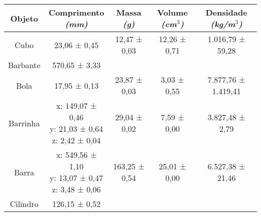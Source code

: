 \documentclass{article}
\begin{document}
\begin{table}[h!]
\centering
\begin{tabular}{c c c c c }
\toprule
Objeto & \shortstack{Comprimento\\\textit{(mm)}} & \shortstack{Massa\\\textit{(g)}} & \shortstack{Volume\\\textit{(cm$^3$)}} & \shortstack{Densidade\\\textit{(kg/m$^3$)}} \\
\midrule
Cubo & 23,06 ± 0,45 & 12,47 ± 0,03 & 12,26 ± 0,71 & 1.016,79 ± 59,28\\[5pt]
Barbante & 570,65 ± 3,33 & & & \\[5pt]
Bola & 17,95 ± 0,13 & 23,87 ± 0,03 & 3,03 ± 0,55 & 7.877,76 ± 1.419,41\\[5pt]
Barrinha & \shortstack{x: 149,07 ± 0,46\\y: 21,03 ± 0,64\\z: 2,42 ± 0,04} & 29,04 ± 0,02 & 7,59 ± 0,00 & 3.827,48 ± 2,79\\[5pt]
Barra & \shortstack{x: 549,56 ± 1,10\\y: 13,07 ± 0,47\\z: 3,48 ± 0,06} & 163,25 ± 0,54 & 25,01 ± 0,00 & 6.527,38 ± 21,46\\[5pt]
Cilindro & 126,15 ± 0,52 & & & \\[5pt]
\bottomrule
\end{tabular}
\end{table}
\end{document}
